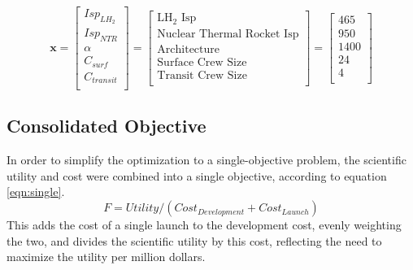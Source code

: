 \documentclass[]{aiaa-pretty}
\begin{document}
\begin{equation*}
\mathbf{x}=
\begin{bmatrix}
Isp_{LH_2}\\
Isp_{NTR}\\
\alpha\\
C_{surf}\\
C_{transit}\\
\end{bmatrix}
=
\begin{bmatrix}
\mbox{LH}_2\mbox{ Isp}\\
\mbox{Nuclear Thermal Rocket Isp}\\
\mbox{Architecture}\\
\mbox{Surface Crew Size}\\
\mbox{Transit Crew Size}\\
\end{bmatrix}
=
\begin{bmatrix}
465\\
950\\
1400\\
24\\
4\\
\end{bmatrix}
\end{equation*}

\subsection{Consolidated Objective}
In order to simplify the optimization to a single-objective problem, the scientific utility and cost were combined into a single objective, according to equation \ref{eqn:single}.
\begin{equation}
F = Utility/(Cost_{Development}+Cost_{Launch})
\label{eqn:single}
\end{equation}
This adds the cost of a single launch to the development cost, evenly weighting the two, and divides the scientific utility by this cost, reflecting the need to maximize the utility per million dollars.
\end{document}
